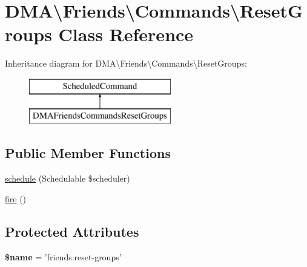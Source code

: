 \hypertarget{classDMA_1_1Friends_1_1Commands_1_1ResetGroups}{\section{D\+M\+A\textbackslash{}Friends\textbackslash{}Commands\textbackslash{}Reset\+Groups Class Reference}
\label{classDMA_1_1Friends_1_1Commands_1_1ResetGroups}
}
Inheritance diagram for D\+M\+A\textbackslash{}Friends\textbackslash{}Commands\textbackslash{}Reset\+Groups\+:\begin{figure}[H]
\begin{center}
\leavevmode
\includegraphics[height=2.000000cm]{dc/d80/classDMA_1_1Friends_1_1Commands_1_1ResetGroups}
\end{center}
\end{figure}
\subsection*{Public Member Functions}
\begin{DoxyCompactItemize}
\item 
\hyperlink{classDMA_1_1Friends_1_1Commands_1_1ResetGroups_a39d5f7e4bd63574e523fb41a392b529e}{schedule} (Schedulable \$scheduler)
\item 
\hyperlink{classDMA_1_1Friends_1_1Commands_1_1ResetGroups_a1671243f4b929d299357d08490661732}{fire} ()
\end{DoxyCompactItemize}
\subsection*{Protected Attributes}
\begin{DoxyCompactItemize}
\item 
\hypertarget{classDMA_1_1Friends_1_1Commands_1_1ResetGroups_a713919df694ce18df9c2527e833dc858}{{\bfseries \$name} = 'friends\+:reset-\/groups'}\label{classDMA_1_1Friends_1_1Commands_1_1ResetGroups_a713919df694ce18df9c2527e833dc858}

\end{DoxyCompactItemize}


